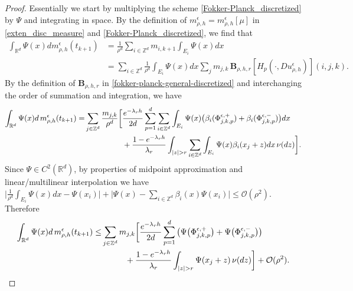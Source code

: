 \documentclass[a4paper,  twoside, 10pt, leqno]{amsart}
\newcommand{\Z}{\mathbb{Z}}
\newcommand{\R}{\mathbb{R}}
\newcommand{\rd}{\mathbb{R}^d}
\theoremstyle{remark}
\theoremstyle{definition}
\begin{document}
\begin{proof}
Essentially we start by
multiplying the scheme \eqref{Fokker-Planck_discretized} by $\Psi$ and integrating in space.
By the definition of $m^{\epsilon}_{\rho,h}=m^{\epsilon}_{\rho,h}[\mu]$ in \eqref{exten_disc_measure}  and \eqref{Fokker-Planck_discretized},
we find that
\begin{align*}
 \int_{\R^d} \Psi(x) dm^{\epsilon}_{\rho,h}(t_{k+1})  &  =  \frac{1}{\rho^d}\sum_{i \in \Z^d} m_{i,k+1} \int_{E_i} \Psi(x) dx \\ 
& =    \sum_{i \in \Z^d} \frac{1}{\rho^d} \int_{E_i} \Psi(x) dx  \sum_{j} m_{j,k}  \, \mathbf{B}_{\rho,h,r} [ H_{p} ( \cdot, Du_{\rho,h}^{\epsilon} ) ] ( i,j,k ).
 \end{align*}
By the definition of $\mathbf{B}_{\rho,h,r}$ in \eqref{fokker-planck-general-discretized} and interchanging the order of summation and integration, we have
\begin{align*}
 \int_{\R^d} \Psi(x) d\,m^{\epsilon}_{\rho,h}(t_{k+1}) 
=&   \sum_{j\in \Z^d} \frac{m_{j,k}}{\rho^{d}} \bigg[ \frac{e^{-\lambda_r h}}{2d}\sum_{p=1}^d\sum_{i\in \Z^d} \int_{E_i} \Psi(x) \big(\beta_i(\Phi^{\epsilon,+}_{j,k,p})+ \beta_i(\Phi^{\epsilon,-}_{j,k,p})\big) dx \\
& \hspace{1.7cm} +\frac{1-e^{-\lambda_r h}}{\lambda_r}\int_{|z|>r} \sum_{i\in \Z^d} \int_{E_i}\Psi(x) \beta_i(x_j  +z) dx \, \nu(dz) \bigg].
\end{align*}
Since $\Psi \in C^2(\rd)$, by properties of midpoint approximation  and linear/multilinear interpolation we have $\big| \frac{1}{\rho^d} \int_{E_i} \Psi(x) dx - \Psi(x_i)\big|  
+  \big|\Psi(x) - \sum_{i\in \Z^d} \beta_i(x) \Psi(x_i)\big|\leq \mathcal{O}(\rho^{2})$.
Therefore
\begin{align}\label{esti_1}
  \int_{\R^d} \Psi(x) d\,m^{\epsilon}_{\rho,h}(t_{k+1})
\leq &  \sum_{j\in \Z^d} m_{j,k}\bigg[\frac{e^{-\lambda_r h}}{2d} \sum_{p=1}^d \big( \Psi\big(\Phi^{\epsilon,+}_{j,k,p}\big) + \Psi\big(\Phi^{\epsilon,-}_{j,k,p}\big)  \big) \\
&\notag  \hspace{1cm}+ \frac{1-e^{-\lambda_r h}}{\lambda_r}\int_{|z|>r} \Psi(x_j+z) \, \nu(dz)\bigg] + \mathcal{O}(\rho^{2}).
\end{align}


\end{proof}
\end{document}
